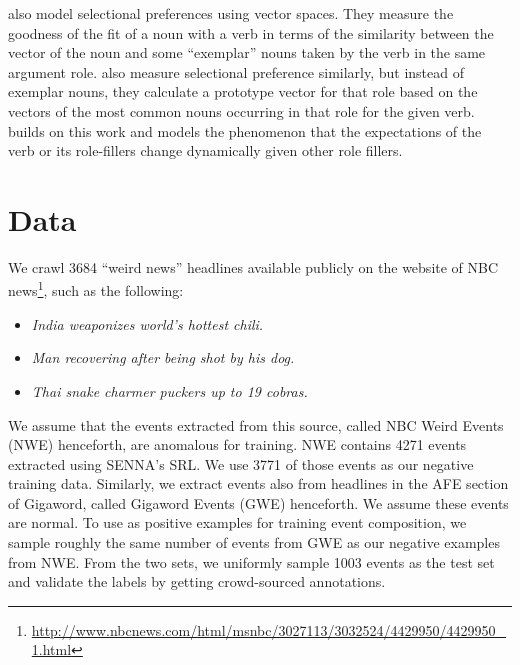 \cite{erk2010flexible} also model selectional preferences using vector spaces.  
They measure the 
goodness of the fit of a noun with a verb in terms of the similarity between the 
vector of the noun and 
some ``exemplar'' nouns taken by the verb in the same argument role.  
\cite{baroni2010distributional} 
also measure selectional preference similarly, but instead of exemplar nouns, 
they calculate a 
prototype vector for that role based on the vectors of the most common nouns 
occurring in that 
role for the given verb.  \cite{lenci2011composing} builds on this work and 
models the phenomenon
that the expectations of the verb or its role-fillers change dynamically given 
other role fillers.


\section{Data}
We crawl 3684 ``weird news'' headlines available publicly 
on the website of NBC
news\footnote{\url{
http://www.nbcnews.com/html/msnbc/3027113/3032524/4429950/4429950_1.html}}, 
such as the following: 
\begin{itemize}
 \item \textit{India weaponizes world's hottest chili.}
 \item \textit{Man recovering after being shot by his dog.}
 \item \textit{Thai snake charmer puckers up to 19 cobras.}
\end{itemize}
We assume that the events extracted from this source, called NBC Weird Events
(NWE) henceforth, are
anomalous for training.  NWE contains 4271 events extracted using 
SENNA's SRL.  We use 3771 of those events as our negative training data. 
Similarly, we extract events also from
headlines in the AFE section of Gigaword, called Gigaword Events (GWE)
henceforth.  We assume these events are normal.
To use as positive examples for training event composition, we sample roughly
the same number of events from 
GWE as our negative examples from NWE. From the two sets, we uniformly sample 
1003 events
as the test set and validate the labels by getting crowd-sourced annotations.

